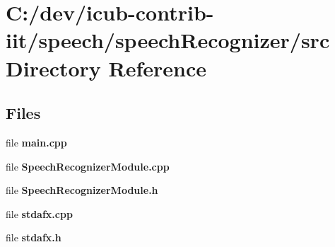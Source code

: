 \section{C\+:/dev/icub-\/contrib-\/iit/speech/speech\+Recognizer/src Directory Reference}
\label{dir_130f2423e4b03c25a1e78c71072864c6}
\subsection*{Files}
\begin{DoxyCompactItemize}
\item 
file {\bfseries main.\+cpp}
\item 
file {\bfseries Speech\+Recognizer\+Module.\+cpp}
\item 
file {\bfseries Speech\+Recognizer\+Module.\+h}
\item 
file {\bfseries stdafx.\+cpp}
\item 
file {\bfseries stdafx.\+h}
\end{DoxyCompactItemize}
